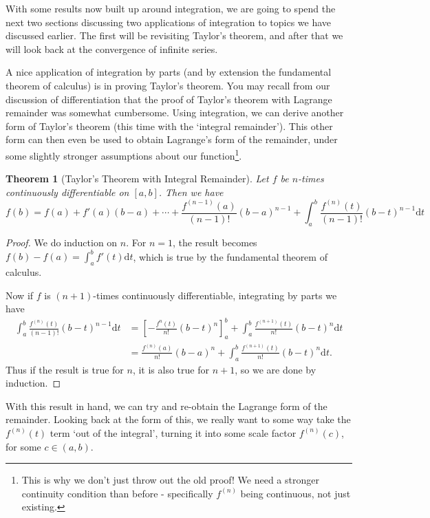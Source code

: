 \documentclass[11pt, a4paper]{article}
\newtheorem{theorem}{Theorem}[section]
\theoremstyle{definition}
\newcommand{\dd}{\mathrm{d}}
\begin{document}
With some results now built up around integration, we are going to spend the next two sections discussing two applications of integration to topics we have discussed earlier. The first will be revisiting Taylor's theorem, and after that we will look back at the convergence of infinite series.

A nice application of integration by parts (and by extension the fundamental theorem of calculus) is in proving Taylor's theorem.
You may recall from our discussion of differentiation that the proof of Taylor's theorem with Lagrange remainder was somewhat cumbersome. Using integration, we can derive another form of Taylor's theorem (this time with the `integral remainder'). This other form can then even be used to obtain Lagrange's form of the remainder, under some slightly stronger assumptions about our function\footnote{This is why we don't just throw out the old proof! We need a stronger continuity condition than before - specifically $f^{(n)}$ being continuous, not just existing.}.

\begin{theorem}[Taylor's Theorem with Integral Remainder]
	Let $f$ be $n$-times continuously differentiable on $[a, b]$. Then we have
	$$
	f(b) = f(a) + f'(a)(b - a) + \cdots + \frac{f^{(n - 1)}(a)}{(n - 1)!} (b - a)^{n - 1} + \int_a^b  \frac{f^{(n)}(t)}{(n - 1)!}(b - t)^{n - 1} \dd t
	$$
\end{theorem}
\begin{proof}
	We do induction on $n$. For $n = 1$, the result becomes $f(b) - f(a) = \int_a^b f'(t) \dd t$, which is true by the fundamental theorem of calculus. 

	Now if $f$ is $(n + 1)$-times continuously differentiable, integrating by parts we have
	\begin{align*}
		\int_a^b \frac{f^{(n)}(t)}{(n - 1)!}(b - t)^{n - 1} \dd t &= \left[- \frac{f^{n}(t)}{n!}(b - t)^n\right]_a^b + \int_a^b \frac{f^{(n + 1)}(t)}{n!} (b - t)^n \dd t \\
		&= \frac{f^{(n)}(a)}{n!}(b - a)^n + \int_a^b \frac{f^{(n + 1)}(t)}{n!} (b - t)^n \dd t.
	\end{align*}
	Thus if the result is true for $n$, it is also true for $n + 1$, so we are done by induction.
\end{proof}

With this result in hand, we can try and re-obtain the Lagrange form of the remainder. Looking back at the form of this, we really want to some way take the $f^{(n)}(t)$ term `out of the integral', turning it into some scale factor $f^{(n)}(c)$, for some $c \in (a, b)$. 
\end{document}
